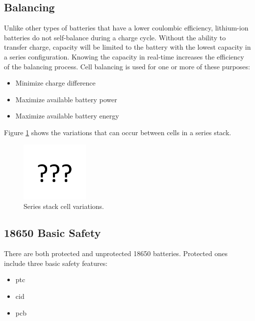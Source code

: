 \subsection{Balancing}
Unlike other types of batteries that have a lower coulombic efficiency, lithium-ion batteries do not self-balance during a charge cycle. Without the ability to transfer charge, capacity will be limited to the battery with the lowest capacity in a series configuration. Knowing the capacity in real-time increases the efficiency of the balancing process.
Cell balancing is used for one or more of these purposes\cite{book183}:

\begin{itemize}[noitemsep]
	\item Minimize charge difference
	\item Maximize available battery power
	\item Maximize available battery energy
\end{itemize}

Figure \ref{fig:variations} shows the variations that can occur between cells in a series stack.

\begin{figure}[H]
	\centering
	\includegraphics[width=0.3\textwidth]{Figures/missing.png} %
	\caption{Series stack cell variations.}
	\label{fig:variations}
\end{figure}

\subsection{18650 Basic Safety}
There are both protected and unprotected 18650 batteries. Protected ones include three basic safety features\cite{webpage}:

\begin{itemize}[noitemsep]
	\item \gls{ptc}
	\item \gls{cid}
	\item \gls{pcb}
\end{itemize}


